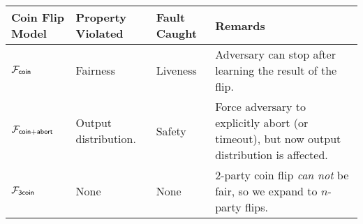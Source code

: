 \begin{center}
\begin{tabularx}{\textwidth}{ || p{} | p{} | p{} | p{} || }
\hline \hline
Coin Flip Model & Property Violated & Fault Caught & Remards
\\ \hline
$\mathcal{F}_{{\mathsf {coin}}}$ & Fairness & Liveness & Adversary can stop after learning the result of the flip.
\\ \hline
$\mathcal{F}_{{\mathsf {coin}}+{\mathsf {abort}}}$ & Output distribution. & Safety & Force adversary to explicitly abort (or timeout), but now output distribution is affected.
\\ \hline
$\mathcal{F}_{{\mathsf {3coin}}}$ & None & None & 2-party coin flip \emph{can not} be fair, so we expand to $n$-party flips.
\\ \hline \hline
\end{tabularx}
\end{center}

